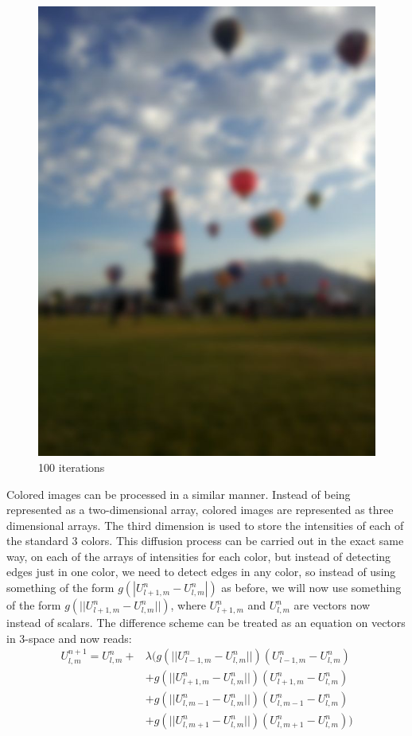 \begin{figure}[ht]
\begin{minipage}[b]{0.45\linewidth}
\includegraphics[width=\textwidth]{baloon_resized_color_100.jpg}
\caption*{100 iterations}
\end{minipage}
\end{figure}
\vfill
\clearpage

Colored images can be processed in a similar manner.
Instead of being represented as a two-dimensional array, colored images are represented as three dimensional arrays.
The third dimension is used to store the intensities of each of the standard 3 colors.
This diffusion process can be carried out in the exact same way, on each of the arrays of intensities for each color, but instead of detecting edges just in one color, we need to detect edges in any color, so instead of using something of the form $g(|U_{l+1,m}^n - U_{l,m}^n|)$ as before, we will now use something of the form $g(||U_{l+1,m}^n - U_{l,m}^n||)$, where $U_{l+1,m}^n$ and $U_{l,m}^n$ are vectors now instead of scalars.
The difference scheme can be treated as an equation on vectors in 3-space and now reads:
\begin{align*}
U_{l,m}^{n+1} = U_{l,m}^n + & \lambda (g(||U_{l-1,m}^n - U_{l,m}^n||)(U_{l-1,m}^n - U_{l,m}^n) \\
					& + g(||U_{l+1,m}^n - U_{l,m}^n||)(U_{l+1,m}^n - U_{l,m}^n) \\
					& + g(||U_{l,m-1}^n - U_{l,m}^n||)(U_{l,m-1}^n - U_{l,m}^n) \\
					& + g(||U_{l,m+1}^n - U_{l,m}^n||)(U_{l,m+1}^n - U_{l,m}^n))
\end{align*}

